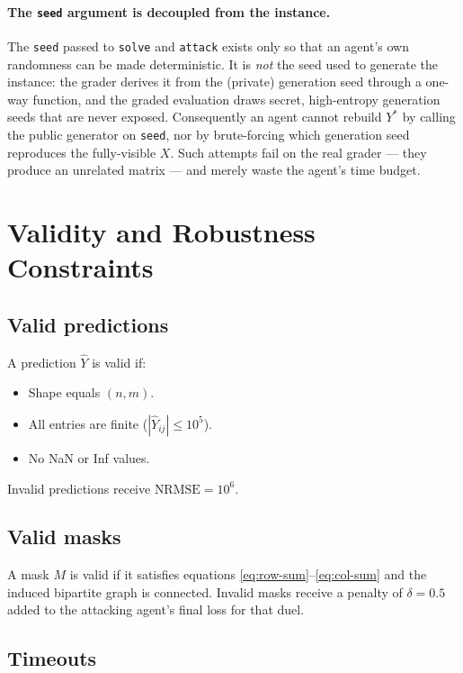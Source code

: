 \documentclass[11pt,a4paper]{article}
\begin{document}
\paragraph{The \texttt{seed} argument is decoupled from the instance.}
The \texttt{seed} passed to \texttt{solve} and \texttt{attack} exists only so
that an agent's own randomness can be made deterministic. It is \emph{not} the
seed used to generate the instance: the grader derives it from the (private)
generation seed through a one-way function, and the graded evaluation draws
secret, high-entropy generation seeds that are never exposed. Consequently an
agent cannot rebuild $Y^*$ by calling the public generator on \texttt{seed}, nor
by brute-forcing which generation seed reproduces the fully-visible $X$. Such
attempts fail on the real grader --- they produce an unrelated matrix --- and
merely waste the agent's time budget.

\section{Validity and Robustness Constraints}

\subsection{Valid predictions}

A prediction $\hat{Y}$ is valid if:
\begin{itemize}
  \item Shape equals $(n, m)$.
  \item All entries are finite ($|\hat{Y}_{ij}| \leq 10^5$).
  \item No NaN or Inf values.
\end{itemize}

Invalid predictions receive $\text{NRMSE} = 10^6$.

\subsection{Valid masks}

A mask $M$ is valid if it satisfies equations \eqref{eq:row-sum}--\eqref{eq:col-sum}
and the induced bipartite graph is connected. Invalid masks receive a penalty of
$\delta = 0.5$ added to the attacking agent's final loss for that duel.

\subsection{Timeouts}
\end{document}
